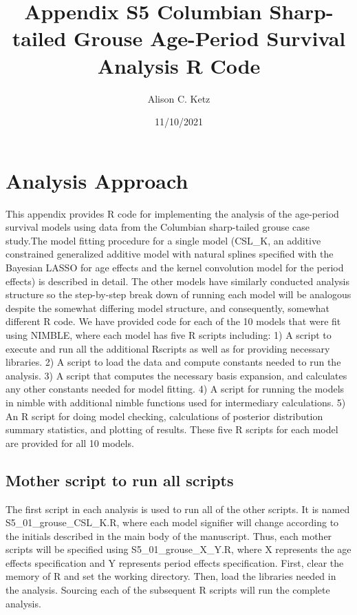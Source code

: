 \documentclass[11pt,]{article}
\title{Appendix S5 Columbian Sharp-tailed Grouse Age-Period Survival Analysis R
Code}
\author{Alison C. Ketz}
\date{11/10/2021}
\begin{document}
\maketitle

\section{Analysis Approach}\label{analysis-approach}

This appendix provides R code for implementing the analysis of the
age-period survival models using data from the Columbian sharp-tailed
grouse case study.The model fitting procedure for a single model
(CSL\_K, an additive constrained generalized additive model with natural
splines specified with the Bayesian LASSO for age effects and the kernel
convolution model for the period effects) is described in detail. The
other models have similarly conducted analysis structure so the
step-by-step break down of running each model will be analogous despite
the somewhat differing model structure, and consequently, somewhat
different R code. We have provided code for each of the 10 models that
were fit using NIMBLE, where each model has five R scripts including: 1)
A script to execute and run all the additional Rscripts as well as for
providing necessary libraries. 2) A script to load the data and compute
constants needed to run the analysis. 3) A script that computes the
necessary basis expansion, and calculates any other constants needed for
model fitting. 4) A script for running the models in nimble with
additional nimble functions used for intermediary calculations. 5) An R
script for doing model checking, calculations of posterior distribution
summary statistics, and plotting of results. These five R scripts for
each model are provided for all 10 models.

\subsection{Mother script to run all
scripts}\label{mother-script-to-run-all-scripts}

The first script in each analysis is used to run all of the other
scripts. It is named S5\_01\_grouse\_CSL\_K.R, where each model
signifier will change according to the initials described in the main
body of the manuscript. Thus, each mother scripts will be specified
using S5\_01\_grouse\_X\_Y.R, where X represents the age effects
specification and Y represents period effects specification. First,
clear the memory of R and set the working directory. Then, load the
libraries needed in the analysis. Sourcing each of the subsequent R
scripts will run the complete analysis.
\end{document}

